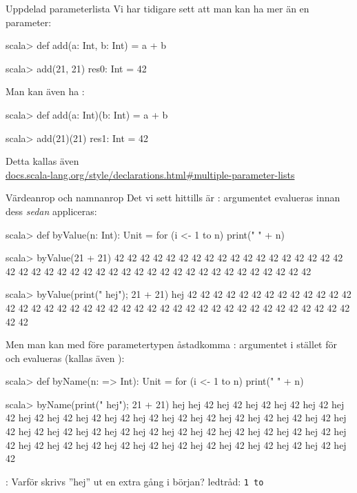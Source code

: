 \begin{Slide}{Uppdelad parameterlista}
Vi har tidigare sett att man kan ha mer än en parameter:
\begin{REPLnonum}
scala> def add(a: Int, b: Int) = a + b

scala> add(21, 21)
res0: Int = 42
\end{REPLnonum}
Man kan även ha  :
\begin{REPLnonum}
scala> def add(a: Int)(b: Int) = a + b

scala> add(21)(21)
res1: Int = 42
\end{REPLnonum}
Detta kallas även  
\\\href{http://docs.scala-lang.org/style/declarations.html#multiple-parameter-lists}{\SlideFontTiny docs.scala-lang.org/style/declarations.html\#multiple-parameter-lists}
\end{Slide}



\begin{Slide}{Värdeanrop och namnanrop}\SlideFontSmall
Det vi sett hittills är : argumentet evalueras  innan dess  \emph{sedan} appliceras:
\begin{REPL}
scala> def byValue(n: Int): Unit = for (i <- 1 to n) print(" " + n)

scala> byValue(21 + 21)
 42 42 42 42 42 42 42 42 42 42 42 42 42 42 42 42 42 42 42 42 42 42 42 42 42 42 42 42 42 42 42 42 42 42 42 42 42 42 42 42 42 42

scala> byValue({print(" hej"); 21 + 21})
 hej 42 42 42 42 42 42 42 42 42 42 42 42 42 42 42 42 42 42 42 42 42 42 42 42 42 42 42 42 42 42 42 42 42 42 42 42 42 42 42 42 42 42
\end{REPL}
\pause
Men man kan med \code{=>} före parametertypen åstadkomma : argumentet  i stället för  och evalueras  (kallas även ):
\begin{REPL}
scala> def byName(n: => Int): Unit = for (i <- 1 to n) print(" " + n)

scala> byName({print(" hej"); 21 + 21})
 hej hej 42 hej 42 hej 42 hej 42 hej 42 hej 42 hej 42 hej 42 hej 42 hej 42 hej 42 hej 42 hej 42 hej 42 hej 42 hej 42 hej 42 hej 42 hej 42 hej 42 hej 42 hej 42 hej 42 hej 42 hej 42 hej 42 hej 42 hej 42 hej 42 hej 42 hej 42 hej 42 hej 42 hej 42 hej 42 hej 42 hej 42 hej 42 hej 42 hej 42 hej 42 hej 42
\end{REPL}
: Varför skrivs ''hej'' ut en extra gång i början? \pause ledtråd: \texttt{1 to }
\end{Slide}

